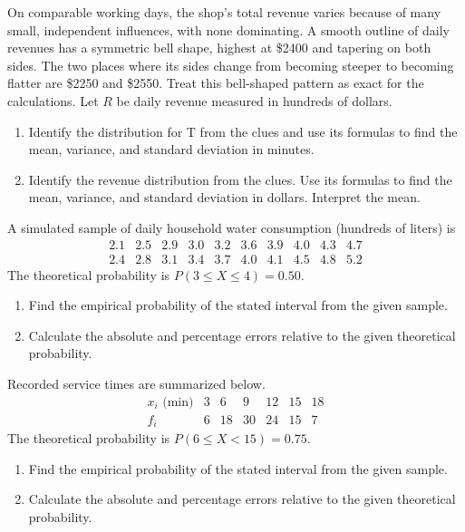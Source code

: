 \begin{multicols}{2}
On comparable working days, the shop's total revenue varies because of many
small, independent influences, with none dominating. A smooth outline of
daily revenues has a symmetric bell shape, highest at \$2400 and tapering
on both sides. The two places where its sides change from becoming steeper
to becoming flatter are \$2250 and \$2550. Treat this bell-shaped pattern
as exact for the calculations. Let $R$ be daily revenue measured in hundreds
of dollars.
\begin{enumerate}[label=\textbf{(\alph*)}]
\item Identify the distribution for T from the clues and use its formulas to find the mean, variance, and standard deviation in minutes. 
\item Identify the revenue distribution from the clues. Use its formulas to find the mean, variance, and standard deviation in dollars. Interpret the mean. 
\end{enumerate}

A simulated sample of daily household water consumption (hundreds of liters) is
\[
\begin{array}{cccccccccc}
2.1&2.5&2.9&3.0&3.2&3.6&3.9&4.0&4.3&4.7\\
2.4&2.8&3.1&3.4&3.7&4.0&4.1&4.5&4.8&5.2
\end{array}
\]
The theoretical probability is $P(3\le X\le4)=0.50$.
\begin{enumerate}[label=\textbf{(\alph*)}]
\item Find the empirical probability of the stated interval from the given sample. 
\item Calculate the absolute and percentage errors relative to the given theoretical probability. 
\end{enumerate}

Recorded service times are summarized below.
\[
\begin{array}{c|rrrrrr}
 x_i\text{ (min)}&3&6&9&12&15&18\\\hline
 f_i&6&18&30&24&15&7
\end{array}
\]
The theoretical probability is $P(6\le X<15)=0.75$.
\begin{enumerate}[label=\textbf{(\alph*)}]
\item Find the empirical probability of the stated interval from the given sample. 
\item Calculate the absolute and percentage errors relative to the given theoretical probability. 
\end{enumerate}


\end{multicols}

